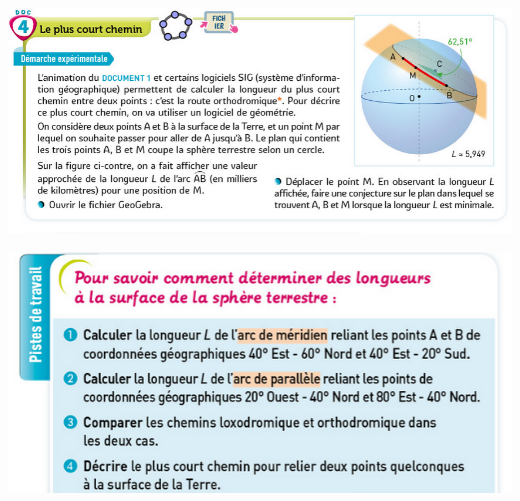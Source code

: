 \documentclass[10pt]{article}
\newcommand{\myscale}{0.46}
\begin{document}
\begin{center}
 	\includegraphics[scale=\myscale]{assets/d4.png}

 	\includegraphics[scale=\myscale]{assets/q.png}
\end{center}

 

\end{document}
